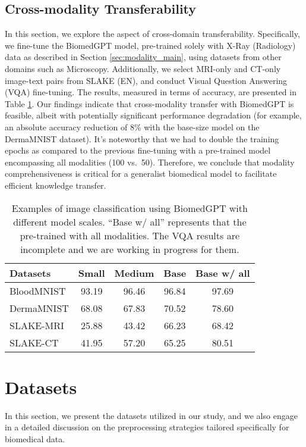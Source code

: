 \documentclass[10pt]{article} \usepackage[preprint]{tmlr}
\begin{document}
\subsection{Cross-modality Transferability} \label{sec:modality_additional}
In this section, we explore the aspect of cross-domain transferability. Specifically, we fine-tune the BiomedGPT model, pre-trained solely with X-Ray (Radiology) data as described in Section \ref{sec:modality_main}, using datasets from other domains such as Microscopy. Additionally, we select MRI-only and CT-only image-text pairs from SLAKE (EN), and conduct Visual Question Answering (VQA) fine-tuning. The results, measured in terms of accuracy, are presented in Table \ref{tab:cm_transfer}. Our findings indicate that cross-modality transfer with BiomedGPT is feasible, albeit with potentially significant performance degradation (for example, an absolute accuracy reduction of 8\% with the base-size model on the DermaMNIST dataset). It's noteworthy that we had to double the training epochs as compared to the previous fine-tuning with a pre-trained model encompassing all modalities (100 vs.\ 50). Therefore, we conclude that modality comprehensiveness is critical for a generalist biomedical model to facilitate efficient knowledge transfer.

\begin{table}[htbp]
\centering
\caption{Examples of image classification using BiomedGPT with different model scales. ``Base w/ all'' represents that the  pre-trained with all modalities. The VQA results are incomplete and we are working in progress for them.} \label{tab:cm_transfer} 
\begin{tabular}{lcccc}
\toprule
Datasets & Small & Medium & Base & Base w/ all \\ \midrule
BloodMNIST & 93.19 & 96.46 & 96.84 & 97.69 \\
DermaMNIST & 68.08 & 67.83 & 70.52 & 78.60 \\
SLAKE-MRI & 25.88  & 43.42 & 66.23 & 68.42 \\
SLAKE-CT & 41.95 & 57.20 & 65.25 & 80.51 \\ \bottomrule
\end{tabular}
\end{table}

\section{Datasets}
In this section, we present the datasets utilized in our study, and we also engage in a detailed discussion on the preprocessing strategies tailored specifically for biomedical data.
\end{document}
